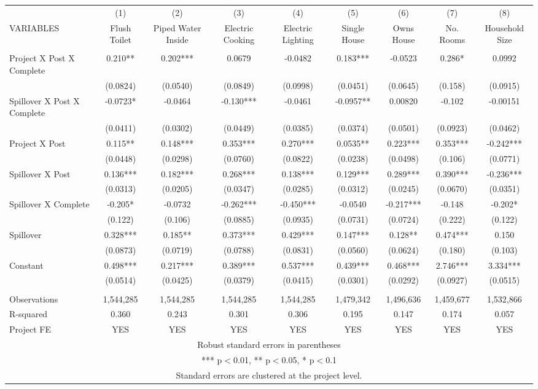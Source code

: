 \begin{tabular}{lcccccccc} \hline
 & (1) & (2) & (3) & (4) & (5) & (6) & (7) & (8) \\
VARIABLES & Flush Toilet & Piped Water Inside & Electric Cooking & Electric Lighting & Single House & Owns House & No. Rooms & Household Size \\ \hline
 &  &  &  &  &  &  &  &  \\
Project X Post X Complete & 0.210** & 0.202*** & 0.0679 & -0.0482 & 0.183*** & -0.0523 & 0.286* & 0.0992 \\
 & (0.0824) & (0.0540) & (0.0849) & (0.0998) & (0.0451) & (0.0645) & (0.158) & (0.0915) \\
 Spillover X Post X Complete & -0.0723* & -0.0464 & -0.130*** & -0.0461 & -0.0957** & 0.00820 & -0.102 & -0.00151 \\
 & (0.0411) & (0.0302) & (0.0449) & (0.0385) & (0.0374) & (0.0501) & (0.0923) & (0.0462) \\
Project X Post & 0.115** & 0.148*** & 0.353*** & 0.270*** & 0.0535** & 0.223*** & 0.353*** & -0.242*** \\
 & (0.0448) & (0.0298) & (0.0760) & (0.0822) & (0.0238) & (0.0498) & (0.106) & (0.0771) \\
Spillover X Post & 0.136*** & 0.182*** & 0.268*** & 0.138*** & 0.129*** & 0.289*** & 0.390*** & -0.236*** \\
 & (0.0313) & (0.0205) & (0.0347) & (0.0285) & (0.0312) & (0.0245) & (0.0670) & (0.0351) \\
Spillover X Complete & -0.205* & -0.0732 & -0.262*** & -0.450*** & -0.0540 & -0.217*** & -0.148 & -0.202* \\
 & (0.122) & (0.106) & (0.0885) & (0.0935) & (0.0731) & (0.0724) & (0.222) & (0.122) \\
Spillover & 0.328*** & 0.185** & 0.373*** & 0.429*** & 0.147*** & 0.128** & 0.474*** & 0.150 \\
 & (0.0873) & (0.0719) & (0.0788) & (0.0831) & (0.0560) & (0.0624) & (0.180) & (0.103) \\
Constant & 0.498*** & 0.217*** & 0.389*** & 0.537*** & 0.439*** & 0.468*** & 2.746*** & 3.334*** \\
 & (0.0514) & (0.0425) & (0.0379) & (0.0415) & (0.0301) & (0.0292) & (0.0927) & (0.0515) \\
 &  &  &  &  &  &  &  &  \\
Observations & 1,544,285 & 1,544,285 & 1,544,285 & 1,544,285 & 1,479,342 & 1,496,636 & 1,459,677 & 1,532,866 \\
R-squared & 0.360 & 0.243 & 0.301 & 0.306 & 0.195 & 0.147 & 0.174 & 0.057 \\
 Project FE & YES & YES & YES & YES & YES & YES & YES & YES \\ \hline
\multicolumn{9}{c}{ Robust standard errors in parentheses} \\
\multicolumn{9}{c}{ *** p$<$0.01, ** p$<$0.05, * p$<$0.1} \\
\multicolumn{9}{c}{ Standard errors are clustered at the project level.} \\
\end{tabular}
